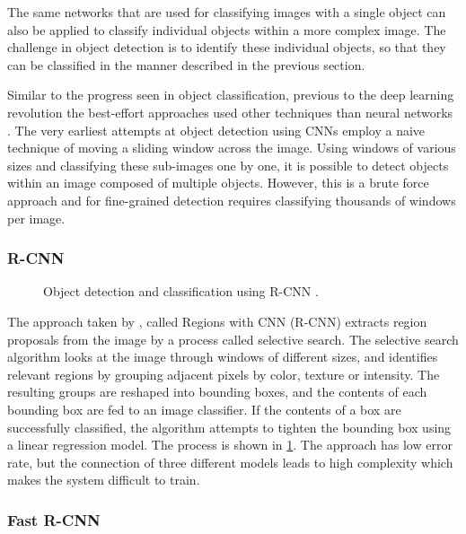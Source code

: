 \documentclass[\rootfolder/main.tex]{subfiles}
\begin{document}
The same networks that are used for classifying images with a single object can also be applied to classify individual objects within a more complex image.
The challenge in object detection is to identify these individual objects, so that they can be classified in the manner described in the previous section.

Similar to the progress seen in object classification, previous to the deep learning revolution the best-effort approaches used other techniques than neural networks \cite{Girshick2013}.
The very earliest attempts at object detection using CNNs employ a naive technique of moving a sliding window across the image.
Using windows of various sizes and classifying these sub-images one by one, it is possible to detect objects within an image composed of multiple objects.
However, this is a brute force approach and for fine-grained detection requires classifying thousands of windows per image.

\subsubsection{R-CNN}

\begin{figure}
    \caption{Object detection and classification using R-CNN \cite{Girshick2013}.\label{fig:r-cnn}}
\end{figure}

The approach taken by \cite{Girshick2013}, called Regions with CNN (R-CNN) extracts region proposals from the image by a process called selective search.
The selective search algorithm looks at the image through windows of different sizes, and identifies relevant regions by grouping adjacent pixels by color, texture or intensity.
The resulting groups are reshaped into bounding boxes, and the contents of each bounding box are fed to an image classifier.
If the contents of a box are successfully classified, the algorithm attempts to tighten the bounding box using a linear regression model.
The process is shown in \cref{fig:r-cnn}.
The approach has low error rate, but the connection of three different models leads to high complexity which makes the system difficult to train.

\subsubsection{Fast R-CNN}
\end{document}
